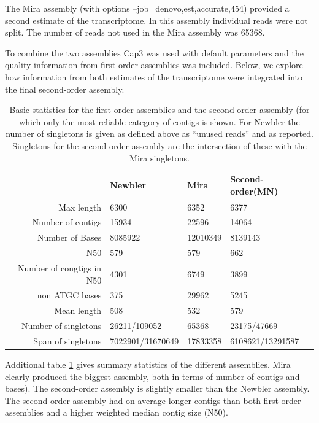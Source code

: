 \documentclass[12pt,a4paper]{article}
\begin{document}
The Mira assembly (with options --job=denovo,est,accurate,454)
provided a second estimate of the transcriptome. In this assembly
individual reads were not split. The number of reads not used in the
Mira assembly was 65368.

To combine the two assemblies Cap3 was used with default parameters
and the quality information from first-order assemblies was
included. Below, we explore how information from both estimates of the
transcriptome were integrated into the final second-order assembly.

\begin{table}[ht]
\begin{center}
\begin{tabular}{rlll}
  \hline
 & Newbler & Mira & Second-order(MN) \\ 
  \hline
Max length & 6300 & 6352 & 6377 \\ 
  Number of contigs & 15934 & 22596 & 14064 \\ 
  Number of Bases &  8085922 & 12010349 &  8139143 \\ 
  N50 & 579 & 579 & 662 \\ 
  Number of congtigs in N50 & 4301 & 6749 & 3899 \\ 
  non ATGC bases &   375 & 29962 &  5245 \\ 
  Mean length & 508 & 532 & 579 \\ 
  Number of singletons & 26211/109052 & 65368 & 23175/47669 \\ 
  Span of singletons & 7022901/31670649 & 17833358 & 6108621/13291587 \\ 
   \hline
\end{tabular}
\caption[Basic statistics for the first-order assemblies and the second-order assembly]{Basic statistics for the first-order assemblies and the second-order assembly (for which only the most reliable category of contigs is shown. For Newbler the number of singletons is given as defined above as ``unused reads'' and as reported. Singletons for the second-order assembly are the intersection of these with the Mira singletons.}
\label{tab:pc}
\end{center}
\end{table}
Additional table \ref{tab:pc} gives summary statistics of the different
assemblies. Mira clearly produced the biggest assembly, both in terms
of number of contigs and bases). The second-order assembly is slightly
smaller than the Newbler assembly.  The second-order assembly had on
average longer contigs than both first-order assemblies and a higher
weighted median contig size (N50).
\end{document}
